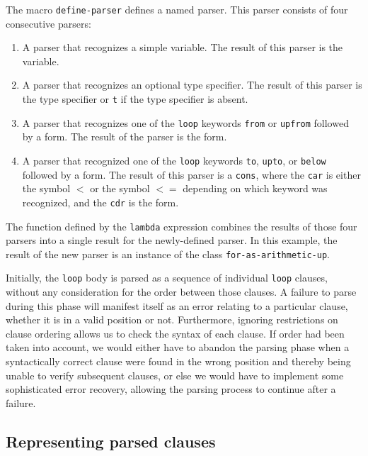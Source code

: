 The macro \texttt{define-parser} defines a named parser.  This parser
consists of four consecutive parsers:

\begin{enumerate}
\item A parser that recognizes a simple variable.  The result of this
  parser is the variable.
\item A parser that recognizes an optional type specifier.  The
  result of this parser is the type specifier or \texttt{t} if the
  type specifier is absent.
\item A parser that recognizes one of the \texttt{loop} keywords
  \texttt{from} or \texttt{upfrom} followed by a form.  The result of
  the parser is the form.
\item A parser that recognized one of the \texttt{loop} keywords
  \texttt{to}, \texttt{upto}, or \texttt{below} followed by a form.
  The result of this parser is a \texttt{cons}, where the \texttt{car}
  is either the symbol \texttt{$<$} or the symbol \texttt{$<=$}
  depending on which keyword was recognized, and the \texttt{cdr} is
  the form.
\end{enumerate}

The function defined by the \texttt{lambda} expression combines the
results of those four parsers into a single result for the
newly-defined parser.  In this example, the result of the new parser
is an instance of the class \texttt{for-as-arithmetic-up}.

Initially, the \texttt{loop} body is parsed as a sequence of
individual \texttt{loop} clauses, without any consideration for the
order between those clauses.  A failure to parse during this phase
will manifest itself as an error relating to a particular clause,
whether it is in a valid position or not.  Furthermore, ignoring
restrictions on clause ordering allows us to check the syntax of each
clause.  If order had been taken into account, we would either have to
abandon the parsing phase when a syntactically correct clause were
found in the wrong position and thereby being unable to verify
subsequent clauses, or else we would have to implement some
sophisticated error recovery, allowing the parsing process to continue
after a failure.

\subsection{Representing parsed clauses}
\label{sec-our-technique-representing-parsed-clauses}

